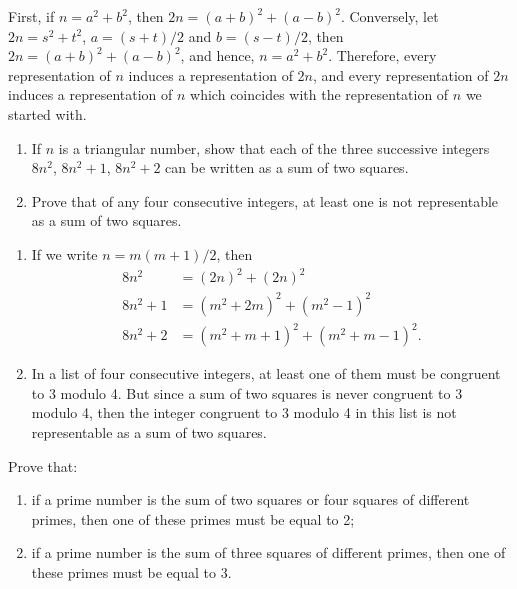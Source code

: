 \begin{solution}
    First, if $n = a^2 + b^2$, then $2n = (a + b)^2 + (a-b)^2$. Conversely, let $2n = s^2 + t^2$, $a = (s + t)/2$ and $b = (s-t)/2$, then $2n = (a + b)^2 + (a-b)^2$, and hence, $n = a^2 + b^2$. Therefore, every representation of $n$ induces a representation of $2n$, and every representation of $2n$ induces a representation of $n$ which coincides with the representation of $n$ we started with.\\
\end{solution}

\begin{exercise}
    \begin{enumerate}
        \item If $n$ is a triangular number, show that each of the three successive integers $8n^2$, $8n^2 + 1$, $8n^2 + 2$ can be written as a sum of two squares.
        \item Prove that of any four consecutive integers, at least one is not representable as a sum of two squares. \\
    \end{enumerate}
\end{exercise}

\begin{solution}
    \begin{enumerate}
        \item If we write $n = m(m+1)/2$, then
        \begin{align*}
            8n^2 &= (2n)^2 + (2n)^2 \\
            8n^2 + 1 &= (m^2 + 2m)^2 + (m^2 - 1)^2 \\
            8n^2 + 2 &= (m^2 + m + 1)^2 + (m^2 + m - 1)^2.
        \end{align*}
        \item In a list of four consecutive integers, at least one of them must be congruent to 3 modulo 4. But since a sum of two squares is never congruent to 3 modulo 4, then the integer congruent to 3 modulo 4 in this list is not representable as a sum of two squares. \\
    \end{enumerate}
\end{solution}

\begin{exercise}
    Prove that:
    \begin{enumerate}
        \item if a prime number is the sum of two squares or four squares of different primes, then one of these primes must be equal to 2;
        \item if a prime number is the sum of three squares of different primes, then one of these primes must be equal to 3. \\
    \end{enumerate}
\end{exercise}


